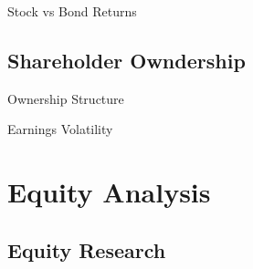 \documentclass[10pt]{article}
\begin{document}
    \begin{core}{Stock vs Bond Returns}



    \end{core}

  \subsection{Shareholder Owndership}

    \begin{core}{Ownership Structure}


    \end{core}

    \begin{core}{Earnings Volatility}


    \end{core}

\section{Equity Analysis}

  \subsection{Equity Research}
\end{document}
